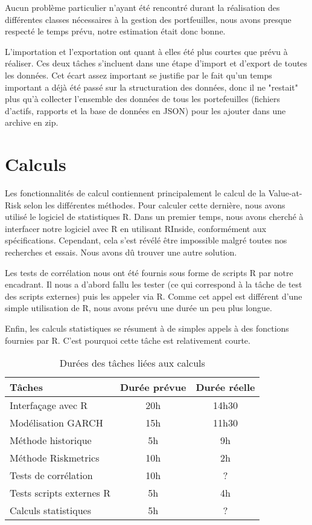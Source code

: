 \documentclass[a4paper]{report}
\begin{document}
Aucun problème particulier n'ayant été rencontré durant la réalisation des différentes classes nécessaires à la gestion des portfeuilles, nous avons presque respecté le temps prévu, notre estimation était donc bonne.

L'importation et l'exportation ont quant à elles été plus courtes que prévu à réaliser.
Ces deux tâches s'incluent dans une étape d'import et d'export de toutes les données.
Cet écart assez important se justifie par le fait qu'un temps important a déjà été passé sur la structuration des données, donc il ne "restait" plus qu'à collecter l'ensemble des données de tous les portefeuilles (fichiers d'actifs, rapports et la base de données en JSON) pour les ajouter dans une archive en zip.

\section{Calculs}
Les fonctionnalités de calcul contiennent principalement le calcul de la Value-at-Risk selon les différentes méthodes.
Pour calculer cette dernière, nous avons utilisé le logiciel de statistiques R.
Dans un premier temps, nous avons cherché à interfacer notre logiciel avec R en utilisant RInside, conformément aux spécifications.
Cependant, cela s'est révélé être impossible malgré toutes nos recherches et essais.
Nous avons dû trouver une autre solution.

Les tests de corrélation nous ont été fournis sous forme de scripts R par notre encadrant.
Il nous a d'abord fallu les tester (ce qui correspond à la tâche de test des scripts externes) puis les appeler via R.
Comme cet appel est différent d'une simple utilisation de R, nous avons prévu une durée un peu plus longue.

Enfin, les calculs statistiques se résument à de simples appels à des fonctions fournies par R.
C'est pourquoi cette tâche est relativement courte.

\begin{table}[H]
\centering
  \begin{tabularx}{0.8\textwidth}{| X | c | c |}
    \hline
	Tâches & Durée prévue & Durée réelle \\
    \hline
    Interfaçage avec R &  20h  & 14h30\\
    Modélisation GARCH &  15h & 11h30\\
    Méthode historique &  5h & 9h\\
    Méthode Riskmetrics &  10h & 2h\\
    Tests de corrélation &  10h & ?\\
    Tests scripts externes R & 5h & 4h\\
    Calculs statistiques &  5h & ?\\
    \hline
  \end{tabularx}
  \caption{Durées des tâches liées aux calculs}
\end{table}
\end{document}
